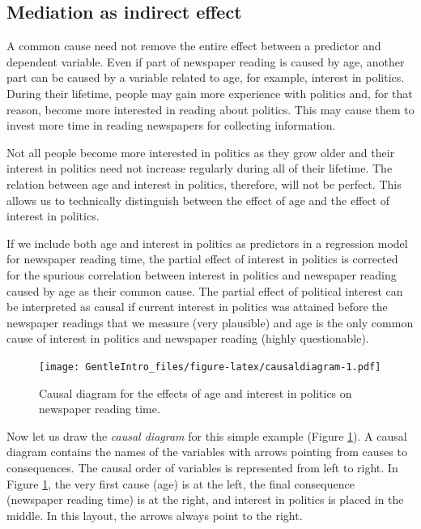 \documentclass[a4paper]{book}
\theoremstyle{definition}
\theoremstyle{definition}
\theoremstyle{definition}
\theoremstyle{remark}
\begin{document}
\subsection{Mediation as indirect effect}\label{indirecteffect}

A common cause need not remove the entire effect between a predictor and
dependent variable. Even if part of newspaper reading is caused by age,
another part can be caused by a variable related to age, for example,
interest in politics. During their lifetime, people may gain more
experience with politics and, for that reason, become more interested in
reading about politics. This may cause them to invest more time in
reading newspapers for collecting information.

Not all people become more interested in politics as they grow older and
their interest in politics need not increase regularly during all of
their lifetime. The relation between age and interest in politics,
therefore, will not be perfect. This allows us to technically
distinguish between the effect of age and the effect of interest in
politics.

If we include both age and interest in politics as predictors in a
regression model for newspaper reading time, the partial effect of
interest in politics is corrected for the spurious correlation between
interest in politics and newspaper reading caused by age as their common
cause. The partial effect of political interest can be interpreted as
causal if current interest in politics was attained before the newspaper
readings that we measure (very plausible) and age is the only common
cause of interest in politics and newspaper reading (highly
questionable).

\begin{figure}
\centering
\texttt{[image: GentleIntro\_files/figure-latex/causaldiagram-1.pdf]}
\caption{\label{fig:causaldiagram}Causal diagram for the effects of age and
interest in politics on newspaper reading time.}
\end{figure}

Now let us draw the \emph{causal diagram} for this simple example
(Figure \ref{fig:causaldiagram}). A causal diagram contains the names of
the variables with arrows pointing from causes to consequences. The
causal order of variables is represented from left to right. In Figure
\ref{fig:causaldiagram}, the very first cause (age) is at the left, the
final consequence (newspaper reading time) is at the right, and interest
in politics is placed in the middle. In this layout, the arrows always
point to the right.
\end{document}
